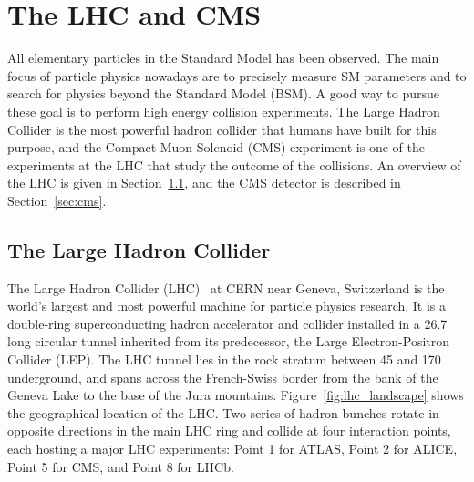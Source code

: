 \chapter{The LHC and CMS}\label{chp:LHC_CMS}

All elementary particles in the Standard Model has been observed.
The main focus of particle physics nowadays are to precisely measure SM parameters 
and to search for physics beyond the Standard Model (BSM). 
A good way to pursue these goal is to perform high energy collision experiments.
The Large Hadron Collider is the most powerful hadron collider that humans have built for this purpose,
and the Compact Muon Solenoid (CMS) experiment is one of the experiments at the LHC that study the outcome of the collisions. 
An overview of the LHC is given in Section~\ref{sec:lhc}, and the CMS detector is described in Section~\ref{sec:cms}.

\section{The Large Hadron Collider}\label{sec:lhc}

The Large Hadron Collider (LHC)~\cite{Evans_2008} at CERN near Geneva, Switzerland is the world's largest and most powerful machine for particle physics research.
It is a double-ring superconducting hadron accelerator and collider installed in a 26.7 \km long circular tunnel inherited from its predecessor, the Large Electron-Positron Collider (LEP).
The LHC tunnel lies in the rock stratum between 45 \meter and 170 \meter underground, 
and spans across the French-Swiss border from the bank of the Geneva Lake to the base of the Jura mountains.   
Figure~\ref{fig:lhc_landscape} shows the geographical location of the LHC. 
Two series of hadron bunches rotate in opposite directions in the main LHC ring and collide at four interaction points, 
each hosting a major LHC experiments: Point 1 for ATLAS, Point 2 for ALICE, Point 5 for CMS, and Point 8 for LHCb.

